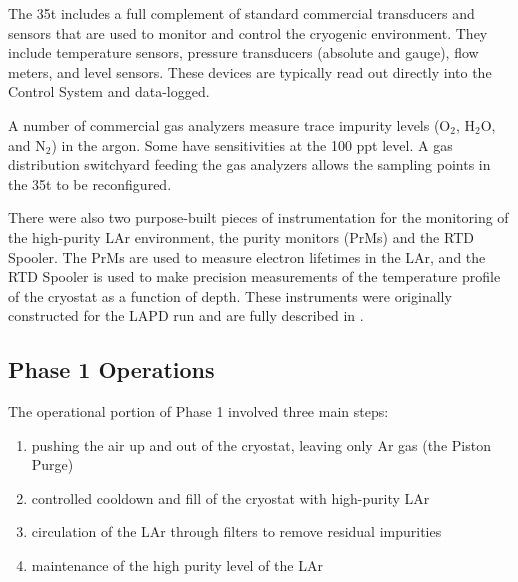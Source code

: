 The 35t includes a full complement of standard commercial transducers and sensors that are used to 
monitor and control the cryogenic environment. They include temperature sensors, pressure transducers 
(absolute and gauge), flow meters, and level sensors. These devices are typically read out directly into the 
Control System and data-logged. 

A number of commercial gas analyzers measure trace impurity levels (O$_2$, H$_2$O, and 
N$_2$) in the argon. Some have sensitivities at the 100 ppt level. A gas distribution switchyard feeding the 
gas analyzers allows the sampling points in the 35t to be reconfigured.

There were also two purpose-built pieces of instrumentation for the monitoring of the high-purity 
LAr environment,   %
the purity monitors (PrMs) and the RTD Spooler. The 
PrMs are used to measure electron lifetimes in the LAr, and the RTD Spooler is used to make precision 
measurements of the temperature profile of the cryostat as a function of depth.  These instruments were 
originally constructed for the LAPD run and are fully described %
in \cite{bib:lapdP07005}.

\subsection {Phase 1 Operations}

The operational portion of Phase 1 involved three main steps: 

\begin{enumerate}
\item{pushing the air up and out of the cryostat, leaving only Ar gas (the Piston Purge)}
\item controlled cooldown and fill of the cryostat with high-purity LAr
\item circulation of the LAr through filters to remove residual impurities
\item maintenance of the high purity level of the LAr
\end{enumerate}

  
